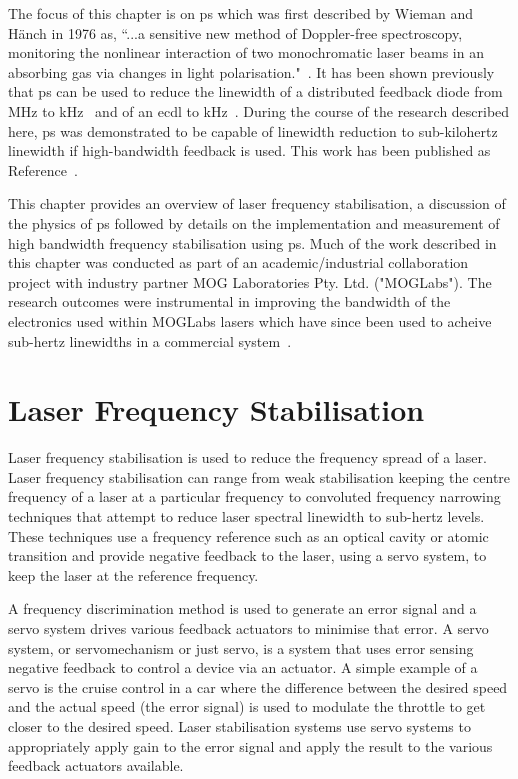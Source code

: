 The focus of this chapter is on \gls{ps} which was first described by Wieman and H\"anch in 1976 as, ``...a sensitive new method of Doppler-free spectroscopy, monitoring the nonlinear interaction of two monochromatic laser beams in an absorbing gas via changes in light polarisation."~\cite{wieman_doppler-free_1976,demtroder_laser_2003}.
It has been shown previously that \gls{ps} can be used to reduce the linewidth of a distributed feedback diode from \unit[2]{MHz} to \unit[20]{kHz}~\cite{torii_laser-phase_2012} and of an \gls{ecdl} to \unit[65]{kHz}~\cite{yoshikawa_frequency_2003}.
During the course of the research described here, \gls{ps} was demonstrated to be capable of linewidth reduction to sub-kilohertz linewidth if high-bandwidth feedback is used.
This work has been published as Reference~\cite{torrance_sub-kilohertz_2016}.

This chapter provides an overview of laser frequency stabilisation, a discussion of the physics of \gls{ps} followed by details on the implementation and measurement of high bandwidth frequency stabilisation using \gls{ps}.
Much of the work described in this chapter was conducted as part of an academic/industrial collaboration project with industry partner MOG Laboratories Pty. Ltd. ("MOGLabs").
The research outcomes were instrumental in improving the bandwidth of the electronics used within MOGLabs lasers which have since been used to acheive sub-hertz linewidths in a commercial system~\cite{menlo_systems_ors-dl_2016}.

\section{Laser Frequency Stabilisation}

Laser frequency stabilisation is used to reduce the frequency spread of a laser.
Laser frequency stabilisation can range from weak stabilisation keeping the centre frequency of a laser at a particular frequency to convoluted frequency narrowing techniques that attempt to reduce laser spectral linewidth to sub-hertz levels.
These techniques use a frequency reference such as an optical cavity or atomic transition and provide negative feedback to the laser, using a servo system, to keep the laser at the reference frequency.

A frequency discrimination method is used to generate an error signal and a servo system drives various feedback actuators to minimise that error.
A servo system, or servomechanism or just servo, is a system that uses error sensing negative feedback to control a device via an actuator.
A simple example of a servo is the cruise control in a car where the difference between the desired speed and the actual speed (the error signal) is used to modulate the throttle to get closer to the desired speed.
Laser stabilisation systems use servo systems to appropriately apply gain to the error signal and apply the result to the various feedback actuators available.

